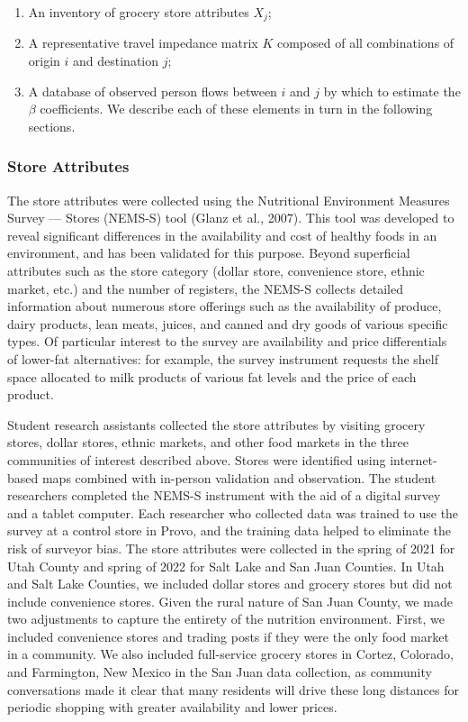 \documentclass[
  letterpaper,
  number,
  review,
  3p]{elsarticle}
\providecommand{\tightlist}{%
  \setlength{\itemsep}{0pt}\setlength{\parskip}{0pt}}\usepackage{longtable,booktabs,array}
\begin{document}
\begin{enumerate}
\def\labelenumi{\arabic{enumi}.}
\tightlist
\item
  An inventory of grocery store attributes \(X_j\);
\item
  A representative travel impedance matrix \(K\) composed of all
  combinations of origin \(i\) and destination \(j\);
\item
  A database of observed person flows between \(i\) and \(j\) by which
  to estimate the \(\beta\) coefficients. We describe each of these
  elements in turn in the following sections.
\end{enumerate}

\subsubsection{Store Attributes}\label{store-attributes}

The store attributes were collected using the Nutritional Environment
Measures Survey --- Stores (NEMS-S) tool (Glanz et al., 2007). This tool
was developed to reveal significant differences in the availability and
cost of healthy foods in an environment, and has been validated for this
purpose. Beyond superficial attributes such as the store category
(dollar store, convenience store, ethnic market, etc.) and the number of
registers, the NEMS-S collects detailed information about numerous store
offerings such as the availability of produce, dairy products, lean
meats, juices, and canned and dry goods of various specific types. Of
particular interest to the survey are availability and price
differentials of lower-fat alternatives: for example, the survey
instrument requests the shelf space allocated to milk products of
various fat levels and the price of each product.

Student research assistants collected the store attributes by visiting
grocery stores, dollar stores, ethnic markets, and other food markets in
the three communities of interest described above. Stores were
identified using internet-based maps combined with in-person validation
and observation. The student researchers completed the NEMS-S instrument
with the aid of a digital survey and a tablet computer. Each researcher
who collected data was trained to use the survey at a control store in
Provo, and the training data helped to eliminate the risk of surveyor
bias. The store attributes were collected in the spring of 2021 for Utah
County and spring of 2022 for Salt Lake and San Juan Counties. In Utah
and Salt Lake Counties, we included dollar stores and grocery stores but
did not include convenience stores. Given the rural nature of San Juan
County, we made two adjustments to capture the entirety of the nutrition
environment. First, we included convenience stores and trading posts if
they were the only food market in a community. We also included
full-service grocery stores in Cortez, Colorado, and Farmington, New
Mexico in the San Juan data collection, as community conversations made
it clear that many residents will drive these long distances for
periodic shopping with greater availability and lower prices.
\end{document}
